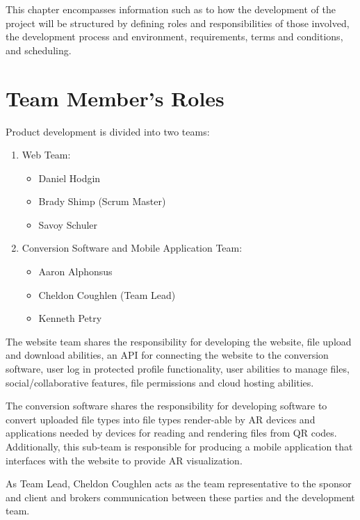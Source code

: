\hspace{7mm}
This chapter encompasses information such as to how the development of the project will be structured
by defining roles and responsibilities of those involved, the development process and environment,
requirements, terms and conditions, and scheduling.

\section{Team Member's Roles}

Product development is divided into two teams:
\begin{enumerate}
    \item Web Team:
        \begin{itemize}
            \item Daniel Hodgin
            \item Brady Shimp (Scrum Master)
            \item Savoy Schuler
        \end{itemize}
    \item Conversion Software and Mobile Application Team:
        \begin{itemize}
            \item Aaron Alphonsus
            \item Cheldon Coughlen (Team Lead)
            \item Kenneth Petry
        \end{itemize}
\end{enumerate}

The website team shares the responsibility for developing the website, file upload and download abilities, an API for connecting the website to the conversion software, user log in protected profile functionality, user abilities to manage files, social/collaborative features, file permissions and cloud hosting abilities.  


The conversion software shares the responsibility for developing software to convert uploaded file types into file types render-able by AR devices and applications needed by devices for reading and rendering files from QR codes.  Additionally,  this sub-team is responsible for producing a mobile application that interfaces with the website to provide AR visualization.


As Team Lead, Cheldon Coughlen acts as the team representative to the sponsor and client and brokers communication between these parties and the development team. 


